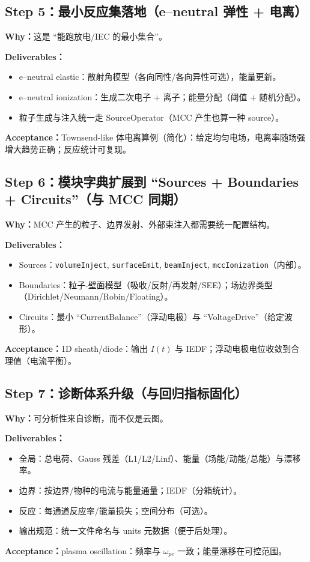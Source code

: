 \documentclass[11pt,a4paper]{ctexart}
\begin{document}
\subsection*{Step 5：最小反应集落地（e--neutral 弹性 + 电离）}
\textbf{Why：}这是 ``能跑放电/IEC 的最小集合''。

\textbf{Deliverables：}
\begin{itemize}[leftmargin=2em]
\item e--neutral elastic：散射角模型（各向同性/各向异性可选），能量更新。
\item e--neutral ionization：生成二次电子 + 离子；能量分配（阈值 + 随机分配）。
\item 粒子生成与注入统一走 SourceOperator（MCC 产生也算一种 source）。
\end{itemize}
\textbf{Acceptance：}Townsend-like 体电离算例（简化）：给定均匀电场，电离率随场强增大趋势正确；反应统计可复现。

\subsection*{Step 6：模块字典扩展到 ``Sources + Boundaries + Circuits''（与 MCC 同期）}
\textbf{Why：}MCC 产生的粒子、边界发射、外部束注入都需要统一配置结构。

\textbf{Deliverables：}
\begin{itemize}[leftmargin=2em]
\item Sources：\texttt{volumeInject}, \texttt{surfaceEmit}, \texttt{beamInject}, \texttt{mccIonization}（内部）。
\item Boundaries：粒子-壁面模型（吸收/反射/再发射/SEE）；场边界类型（Dirichlet/Neumann/Robin/Floating）。
\item Circuits：最小 ``CurrentBalance''（浮动电极）与 ``VoltageDrive''（给定波形）。
\end{itemize}
\textbf{Acceptance：}1D sheath/diode：输出 $I(t)$ 与 IEDF；浮动电极电位收敛到合理值（电流平衡）。

\subsection*{Step 7：诊断体系升级（与回归指标固化）}
\textbf{Why：}可分析性来自诊断，而不仅是云图。

\textbf{Deliverables：}
\begin{itemize}[leftmargin=2em]
\item 全局：总电荷、Gauss 残差（L1/L2/Linf）、能量（场能/动能/总能）与漂移率。
\item 边界：按边界/物种的电流与能量通量；IEDF（分箱统计）。
\item 反应：每通道反应率/能量损失；空间分布（可选）。
\item 输出规范：统一文件命名与 units 元数据（便于后处理）。
\end{itemize}
\textbf{Acceptance：}plasma oscillation：频率与 $\omega_{pe}$ 一致；能量漂移在可控范围。
\end{document}
